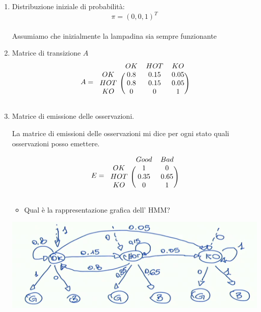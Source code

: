 \documentclass{article}
\begin{document}
\begin{enumerate}
	\item Distribuzione iniziale di probabilità: \[\pi = (0, 0, 1)^T \] \\
	     Assumiamo che inizialmente la lampadina sia sempre funzionante
	     
	\item Matrice di transizione $A$ 
	\[
	A = 
	\begin{blockarray}{cccccc}
		& OK & HOT & KO \\
		\begin{block}{c(ccccc)}
			OK &	0.8 &  0.15   & 0.05   \\
			HOT &	0.8 &  0.15   & 0.05 \\
			KO &	0   &  0      & 1   \\
		\end{block}
	\end{blockarray}
	\]	
	
	\item Matrice di emissione delle osservazioni.
	
	\begin{mdframed}[hidealllines=true,backgroundcolor=blue!20]
		La matrice di emissioni delle osservazioni mi dice per ogni stato quali osservazioni posso emettere.
	\end{mdframed} 
		\[
	E = 
	\begin{blockarray}{cccccc}
		& Good & Bad \\
		\begin{block}{c(ccccc)}
			OK  &	1    &  0   \\
			HOT &	0.35 &  0.65   \\
			KO  &	0    &  1      \\
		\end{block}
	\end{blockarray}
	\]	

\pagebreak

\begin{itemize}
 \item  Qual è la rappresentazione grafica dell' HMM?
\end{itemize}
	\begin{center}
		\includegraphics[width=14cm]{./immagini/hmm_es1.png}
	\end{center}
	
\end{enumerate}
\end{document}

